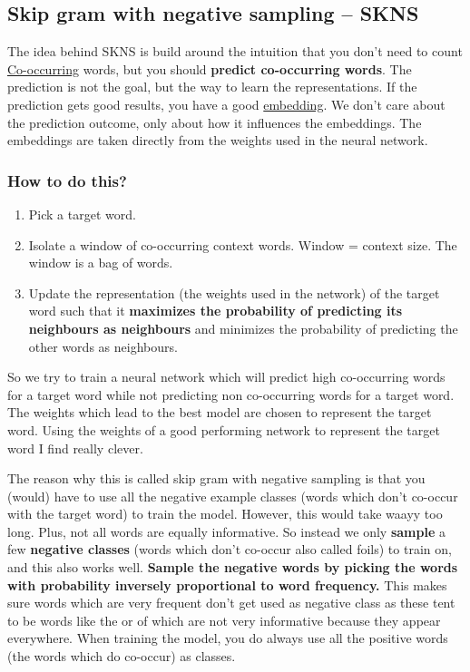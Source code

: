 \documentclass[
  11pt,
  british,
]{article}
\providecommand{\tightlist}{%
  \setlength{\itemsep}{0pt}\setlength{\parskip}{0pt}}
\begin{document}
\hypertarget{skip-gram-with-negative-sampling-skns}{%
\subsection{Skip gram with negative sampling --
SKNS}\label{skip-gram-with-negative-sampling-skns}}

The idea behind SKNS is build around the intuition that you don't need
to count \href{Co-occurrence.md}{Co-occurring} words, but you should
\textbf{predict co-occurring words}. The prediction is not the goal, but
the way to learn the representations. If the prediction gets good
results, you have a good \href{Embeddings.md}{embedding}. We don't care
about the prediction outcome, only about how it influences the
embeddings. The embeddings are taken directly from the weights used in
the neural network.

\hypertarget{how-to-do-this}{%
\subsubsection{How to do this?}\label{how-to-do-this}}

\begin{enumerate}
\def\labelenumi{\arabic{enumi}.}
\tightlist
\item
  Pick a target word.
\item
  Isolate a window of co-occurring context words. Window = context size.
  The window is a bag of words.
\item
  Update the representation (the weights used in the network) of the
  target word such that it \textbf{maximizes the probability of
  predicting its neighbours as neighbours} and minimizes the probability
  of predicting the other words as neighbours.
\end{enumerate}

So we try to train a neural network which will predict high co-occurring
words for a target word while not predicting non co-occurring words for
a target word. The weights which lead to the best model are chosen to
represent the target word. Using the weights of a good performing
network to represent the target word I find really clever.

The reason why this is called skip gram with negative sampling is that
you (would) have to use all the negative example classes (words which
don't co-occur with the target word) to train the model. However, this
would take waayy too long. Plus, not all words are equally informative.
So instead we only \textbf{sample} a few \textbf{negative classes}
(words which don't co-occur also called foils) to train on, and this
also works well. \textbf{Sample the negative words by picking the words
with probability inversely proportional to word frequency.} This makes
sure words which are very frequent don't get used as negative class as
these tent to be words like the or of which are not very informative
because they appear everywhere. When training the model, you do always
use all the positive words (the words which do co-occur) as classes.
\end{document}
